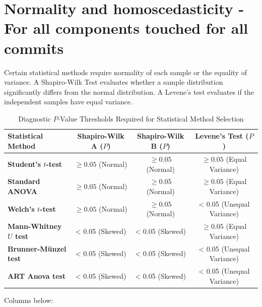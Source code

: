\section{Normality and homoscedasticity - For all components touched for all commits} 

Certain statistical methods require normality of each sample or the equality of variance. A Shapiro-Wilk Test evaluates whether a sample distribution significantly differs from the normal distribution. A Levene's test evaluates if the independent samples have equal variance.  

\begin{table}[htbp]
\centering
\caption{Diagnostic $P$-Value Thresholds Required for Statistical Method Selection}
\label{tab:diagnostic_threshold_matrix}
\begin{tabular}{lccc}
\toprule
\textbf{Statistical Method} & \textbf{Shapiro-Wilk A ($P$)} & \textbf{Shapiro-Wilk B ($P$)} & \textbf{Levene's Test ($P$)} \\
\midrule
\textbf{Student's $t$-test} & $\ge 0.05$ (Normal) & $\ge 0.05$ (Normal) & $\ge 0.05$ (Equal Variance) \\
\textbf{Standard ANOVA}     & $\ge 0.05$ (Normal) & $\ge 0.05$ (Normal) & $\ge 0.05$ (Equal Variance) \\
\textbf{Welch's $t$-test}   & $\ge 0.05$ (Normal) & $\ge 0.05$ (Normal) & \textless{} 0.05 (Unequal Variance) \\
\textbf{Mann-Whitney $U$ test} & \textless{} 0.05 (Skewed) & \textless{} 0.05 (Skewed) & $\ge 0.05$ (Equal Variance) \\
\textbf{Brunner-Münzel test}   & \textless{} 0.05 (Skewed) & \textless{} 0.05 (Skewed) & \textless{} 0.05 (Unequal Variance) \\
\textbf{ART Anova test}   & \textless{} 0.05 (Skewed) & \textless{} 0.05 (Skewed) & \textless{} 0.05 (Unequal Variance) \\
\bottomrule
\end{tabular}
\end{table}
Columns below:  
